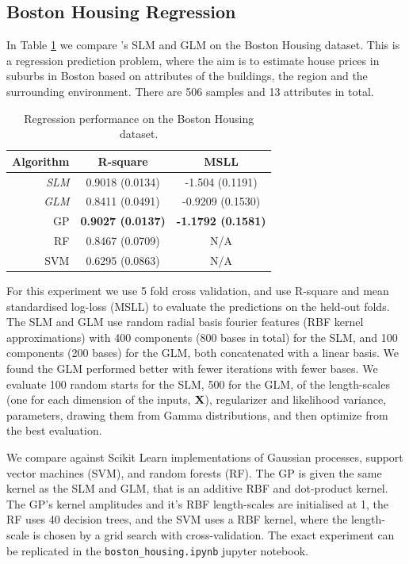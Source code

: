 \documentclass[11pt, oneside]{article}
\begin{document}
\subsection{Boston Housing Regression}

In Table \ref{tab:bostonhousing} we compare \revrand{}'s SLM and GLM on the
Boston Housing dataset. This is a regression prediction problem, where the aim
is to estimate house prices in suburbs in Boston based on attributes of the
buildings, the region and the surrounding environment. There are 506 samples
and 13 attributes in total.

\begin{table}[tb]

    \centering
    \caption{Regression performance on the Boston Housing dataset.}
    \label{tab:bostonhousing}
    \begin{tabular}{r|c c}
        \textbf{Algorithm} & \textbf{R-square} & \textbf{MSLL} \\
        \hline
        \emph{SLM} & 0.9018 (0.0134) & -1.504 (0.1191) \\
        \emph{GLM} & 0.8411 (0.0491) & -0.9209 (0.1530) \\
        GP & \textbf{0.9027 (0.0137)} & \textbf{-1.1792 (0.1581)} \\
        RF & 0.8467 (0.0709) & N/A \\ 
        SVM & 0.6295 (0.0863) & N/A \\
        \hline
    \end{tabular}

\end{table}

For this experiment we use 5 fold cross validation, and use R-square and mean
standardised log-loss (MSLL) to evaluate the predictions on the held-out folds.
The SLM and GLM use random radial basis fourier features (RBF kernel
approximations) with 400 components (800 bases in total) for the SLM, and 100
components (200 bases) for the GLM, both concatenated with a linear basis. We
found the GLM performed better with fewer iterations with fewer bases. We
evaluate 100 random starts for the SLM, 500 for the GLM, of the length-scales
(one for each dimension of the inputs, $\mathbf{X}$), regularizer and likelihood
variance, parameters, drawing them from Gamma distributions, and then optimize
from the best evaluation.

We compare against Scikit Learn \citep{scikit-learn} implementations of
Gaussian processes, support vector machines (SVM), and random forests (RF).
The GP is given the same kernel as the SLM and GLM, that is an additive RBF and
dot-product kernel. The GP's kernel amplitudes and it's RBF length-scales are
initialised at 1, the RF uses 40 decision trees, and the SVM uses a RBF kernel,
where the length-scale is chosen by a grid search with cross-validation. The
exact experiment can be replicated in the \texttt{boston\_housing.ipynb}
jupyter notebook.
\end{document}
